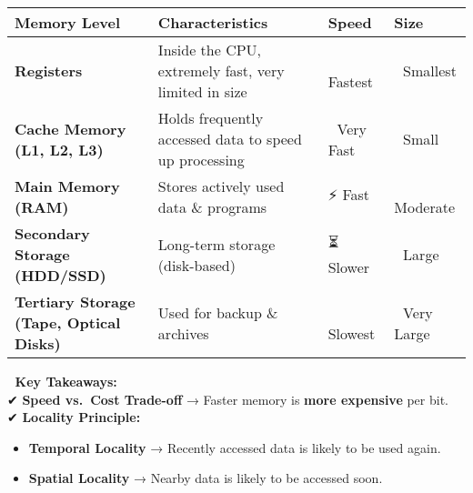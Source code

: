 \documentclass[
]{article}
\providecommand{\tightlist}{%
  \setlength{\itemsep}{0pt}\setlength{\parskip}{0pt}}
\begin{document}
\begin{longtable}[]{@{}
  >{\raggedright\arraybackslash}p{}
  >{\raggedright\arraybackslash}p{}
  >{\raggedright\arraybackslash}p{}
  >{\raggedright\arraybackslash}p{}@{}}
\toprule\noalign{}
\begin{minipage}[b]{\linewidth}\raggedright
\textbf{Memory Level}
\end{minipage} & \begin{minipage}[b]{\linewidth}\raggedright
\textbf{Characteristics}
\end{minipage} & \begin{minipage}[b]{\linewidth}\raggedright
\textbf{Speed}
\end{minipage} & \begin{minipage}[b]{\linewidth}\raggedright
\textbf{Size}
\end{minipage} \\
\midrule\noalign{}
\endhead
\bottomrule\noalign{}
\endlastfoot
\textbf{Registers} & Inside the CPU, extremely fast, very limited in
size & 🚀 Fastest & 🔹 Smallest \\
\textbf{Cache Memory (L1, L2, L3)} & Holds frequently accessed data to
speed up processing & 🚀 Very Fast & 🔹 Small \\
\textbf{Main Memory (RAM)} & Stores actively used data \& programs & ⚡
Fast & 🔹 Moderate \\
\textbf{Secondary Storage (HDD/SSD)} & Long-term storage (disk-based) &
⏳ Slower & 🔹 Large \\
\textbf{Tertiary Storage (Tape, Optical Disks)} & Used for backup \&
archives & 🐌 Slowest & 🔹 Very Large \\
\end{longtable}

📌 \textbf{Key Takeaways:}\\
✔ \textbf{Speed vs.~Cost Trade-off} → Faster memory is \textbf{more
expensive} per bit.\\
✔ \textbf{Locality Principle:}

\begin{itemize}
\tightlist
\item
  \textbf{Temporal Locality} → Recently accessed data is likely to be
  used again.
\item
  \textbf{Spatial Locality} → Nearby data is likely to be accessed soon.
\end{itemize}
\end{document}
